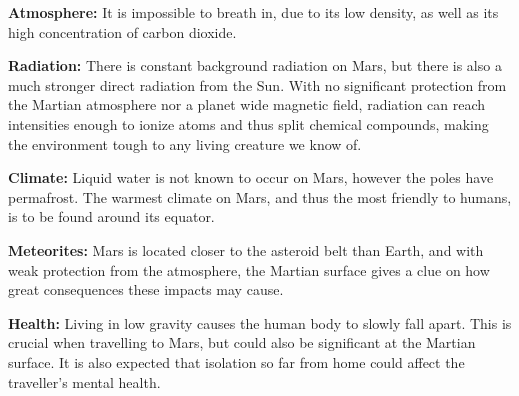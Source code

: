 
\begin{tcolorbox}[colback=red!5,colframe=DarkRed!40!black,title=5 dangers for humans to overcome at Mars \cite{dangers}]
\textbf{Atmosphere:} It is impossible to breath in, due to its low density, as well as its high concentration of carbon dioxide.

\textbf{Radiation:} There is constant background radiation on Mars, but there is also a much stronger direct radiation from the Sun.
With no significant protection from the Martian atmosphere nor a planet wide magnetic field, radiation can reach intensities enough to ionize atoms and thus split chemical compounds, making the environment tough to any living creature we know of.

\textbf{Climate:} Liquid water is not known to occur on Mars, however the poles have permafrost. The warmest climate on Mars, and thus the most friendly to humans, is to be found around its equator.

\textbf{Meteorites:} Mars is located closer to the asteroid belt than Earth, and with weak protection from the atmosphere, the Martian surface gives a clue on how great consequences these impacts may cause.

\textbf{Health:} Living in low gravity causes the human body to slowly fall apart.
This is crucial when travelling to Mars, but could also be significant at the Martian surface.
It is also expected that isolation so far from home could affect the traveller's mental health.
\end{tcolorbox}